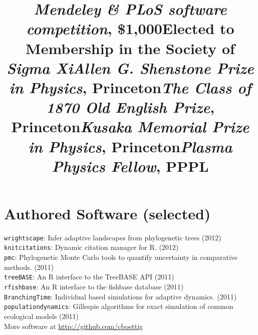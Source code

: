 \documentclass[margin]{res}
\begin{document}
\begin{resume}
\title{\emph{Mendeley \& PLoS software competition}, \$1,000}
\begin{position} \vspace{-.8cm} \end{position}

\title{Elected to Membership in the Society of \emph{Sigma Xi}}
\begin{position}   \vspace{-.8cm} \end{position}

\title{\emph{Allen G. Shenstone Prize in Physics}, Princeton}
\begin{position}   \vspace{-.8cm} \end{position}

\title{\emph{The Class of 1870 Old English Prize},  Princeton}
\begin{position}   \vspace{-.8cm} \end{position}

\title{\emph{Kusaka Memorial Prize in Physics}, Princeton}
\begin{position}   \vspace{-.8cm} \end{position}

\title{\emph{Plasma Physics Fellow},  PPPL }
\begin{position}   \vspace{-.8cm} \end{position}



  
  \section{Authored Software (selected)} 
{ \footnotesize
\texttt{wrightscape}: Infer adaptive landscapes from phylogenetic trees (2012) \\
\texttt{knitcitations}: Dynamic citation manager for R. (2012) \\
\texttt{pmc}: Phylogenetic Monte Carlo tools to quantify uncertainty in comparative methods. (2011)\\
\texttt{treeBASE}: An R interface to the TreeBASE API (2011) \\
\texttt{rfishbase}: An R interface to the fishbase database (2011) \\
\texttt{BranchingTime}: Individual based simulations for adaptive dynamics. (2011) \\
\texttt{populationdynamics}: Gillespie algorithms for exact simulation of common ecological models (2011) \\ 
More software at \href{http://github.com/cboettig}{http://github.com/cboettig}
}


\end{resume}
\end{document}
